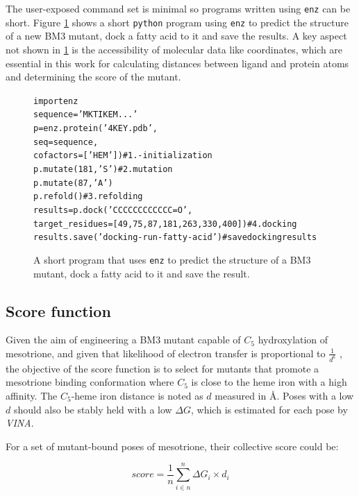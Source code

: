 \documentclass[16pt]{book}
\begin{document}
The user-exposed command set is minimal so programs written using \texttt{enz} can be short.
Figure \ref{alltt} shows a short \texttt{python} program using \texttt{enz} to predict the structure of a new BM3 mutant, dock a fatty acid to it and save the results.
A key aspect not shown in \ref{alltt} is the accessibility of molecular data like coordinates, which are essential in this work for calculating distances between ligand and protein atoms and determining the score of the mutant.

\begin{figure}
	\caption{\label{alltt} A short program that uses \texttt{enz} to predict the structure of a BM3 mutant, dock a fatty acid to it and save the result.}
\begin{alltt}
        import enz 
        sequence = 'MKTIKEM...' 
        p = enz.protein('4KEY.pdb', 
                        seq=sequence, 
                        cofactors=['HEM']) \# 1. - initialization 
        p.mutate(181, 'S') \# 2. mutation
        p.mutate(87, 'A')
        p.refold() \# 3. refolding
        results = p.dock('CCCCCCCCCCCC=O',
                         target\_residues=[49, 75, 87, 181, 263, 330, 400]) \# 4. docking 
        results.save('docking-run-fatty-acid') \# save docking results
\end{alltt}
\end{figure}
\subsection{Score function \label{scorefn}}
Given the aim of engineering a BM3 mutant capable of $C_5$ hydroxylation of mesotrione, and given that likelihood of electron transfer is proportional to $\frac{1}{d^6}$ \cite{moser2008distance}, the objective of the score function is to select for mutants that promote a mesotrione binding conformation where $C_5$ is close to the heme iron with a high affinity.
The $C_5$-heme iron distance is noted as $d$ measured in \AA.
Poses with a low $d$ should also be stably held with a low $\Delta G$, which is estimated for each pose by \textit{VINA}.

For a set of mutant-bound poses of mesotrione, their collective score could be:

\begin{equation}
	score = \frac{1}{n} \sum^{n}_{i\in n} \Delta G_{i} \times d_i
\end{equation}
\end{document}
